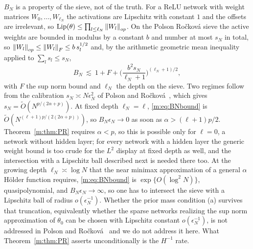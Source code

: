 \begin{remark}\label{m:rem:BN}
$B_N$ is a property of the sieve, not of the truth. For a ReLU network with weight matrices $W_0,\dots,W_{\ell_N}$ the activations are Lipschitz with constant $1$ and the offsets are irrelevant, so $\mathrm{Lip}(\theta)\le\prod_{l\le\ell_N}\left\|W_l\right\|_{op}$. On the Polson Ro\v{c}kov\'a sieve the active weights are bounded in modulus by a constant $b$ and number at most $s_N$ in total, so $\left\|W_l\right\|_{op}\le\left\|W_l\right\|_F\le b\,s_l^{1/2}$ and, by the arithmetic geometric mean inequality applied to $\sum_ls_l\le s_N$,
\begin{equation}\label{m:eq:BNbound}
B_N\ \lesssim\ 1+F+\Big(\frac{b^2s_N}{\ell_N+1}\Big)^{(\ell_N+1)/2},
\end{equation}
with $F$ the sup norm bound and $\ell_N$ the depth on the sieve. Two regimes follow from the calibration $s_N\asymp N\epsilon_N^2$ of Polson and Ro\v{c}kov\'a~\cite{polsonrockova2018}, which gives $s_N=\tilde O(N^{p/(2\alpha+p)})$. At fixed depth $\ell_N=\ell$, \eqref{m:eq:BNbound} is $\tilde O(N^{(\ell+1)p/(2(2\alpha+p))})$, so $B_N\epsilon_N\to0$ as soon as $\alpha>(\ell+1)p/2$. Theorem~\ref{m:thm:PR} requires $\alpha<p$, so this is possible only for $\ell=0$, a network without hidden layer; for every network with a hidden layer the generic weight bound is too crude for the $L^2$ display at fixed depth as well, and the intersection with a Lipschitz ball described next is needed there too. At the growing depth $\ell_N\asymp\log N$ that the near minimax approximation of a general $\alpha$ H\"older function requires, \eqref{m:eq:BNbound} is $\exp\{O(\log^2N)\}$, quasipolynomial, and $B_N\epsilon_N\to\infty$, so one has to intersect the sieve with a Lipschitz ball of radius $o(\epsilon_N^{-1})$. Whether the prior mass condition (a) survives that truncation, equivalently whether the sparse networks realizing the sup norm approximation of $\theta_0$ can be chosen with Lipschitz constant $o(\epsilon_N^{-1})$, is not addressed in Polson and Ro\v{c}kov\'a~\cite{polsonrockova2018} and we do not address it here. What Theorem~\ref{m:thm:PR} asserts unconditionally is the $H^{-1}$ rate.
\end{remark}

